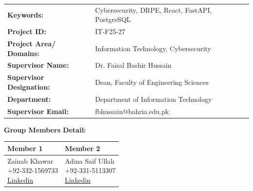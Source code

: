 \documentclass[a4paper]{article}
\begin{document}
\begin{center}
\begin{tabular}{ll}
{\textbf{Keywords:}} & Cybersecurity, DRPE, React, FastAPI, PostgreSQL  \\ \vspace{0.5em}
{\textbf{Project ID:}} & IT-F25-27             \\ \vspace{0.5em}
{\textbf{Project Area/ Domains:}} & Information Technology, Cybersecurity              \\ \vspace{0.5em} 
{\textbf{Supervisor Name:}} & Dr. Faisal Bashir Hussain    \\ \vspace{0.5em}
{\textbf{Supervisor Designation:}} & Dean, Faculty of Engineering Sciences\\ \vspace{0.5em}
{\textbf{Department:}} & Department of Information Technology    \\ \vspace{0.5em} 
{\textbf{Supervisor Email:}} & fbhussain@bahria.edu.pk\\
\end{tabular}
\end{center}

\vspace{1em}
\noindent\textbf{Group Members Detail:}\\

\begin{center}
\begin{tabular}{|p{}|p{}|} 
\hline
\textbf{Member 1} & \textbf{Member 2}  \\
\hline
\makecell{Zainab Khawar \\ +92-332-1569733\\ \href{https://pk.linkedin.com/in/zainab-khawar-a963aa30b}{Linkedin}}
&
\makecell{Adina Saif Ullah \\ +92-331-5113307\\ \href{https://www.linkedin.com/in/adina-saif-ullah-629863257}{Linkedin}}
  \\ 
\hline

\end{tabular}
\end{center}
\end{document}
